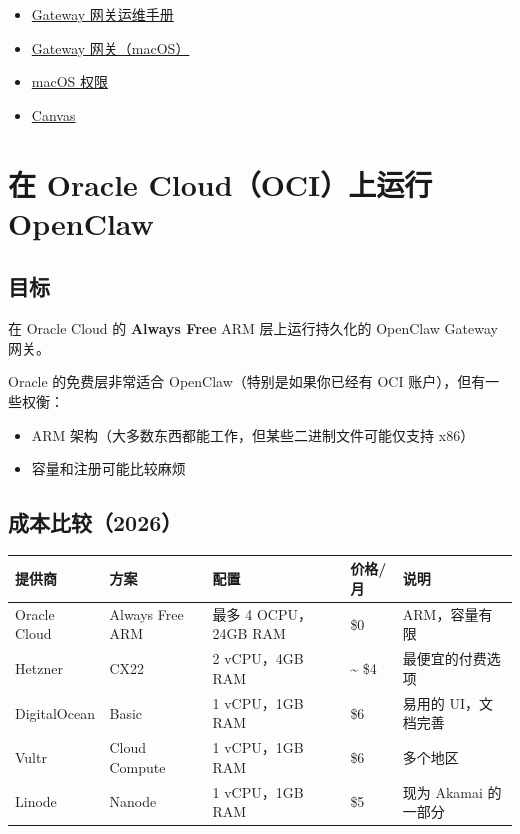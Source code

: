 \begin{itemize}
  \item \href{/gateway}{Gateway 网关运维手册}
  \item \href{/platforms/mac/bundled-gateway}{Gateway 网关（macOS）}
  \item \href{/platforms/mac/permissions}{macOS 权限}
  \item \href{/platforms/mac/canvas}{Canvas}
\end{itemize}



\clearpage

\section{在 Oracle Cloud（OCI）上运行 OpenClaw}


\subsection{目标}


在 Oracle Cloud 的 \textbf{Always Free} ARM 层上运行持久化的 OpenClaw Gateway 网关。

Oracle 的免费层非常适合 OpenClaw（特别是如果你已经有 OCI 账户），但有一些权衡：

\begin{itemize}
  \item ARM 架构（大多数东西都能工作，但某些二进制文件可能仅支持 x86）
  \item 容量和注册可能比较麻烦
\end{itemize}


\subsection{成本比较（2026）}



\begin{table}[h]
\centering
\small
\begin{tabular}{|l|l|l|l|l|}
\hline
提供商 & 方案 & 配置 & 价格/月 & 说明 \\
\hline
Oracle Cloud & Always Free ARM & 最多 4 OCPU，24GB RAM & \$0 & ARM，容量有限 \\
\hline
Hetzner & CX22 & 2 vCPU，4GB RAM & \textasciitilde{} \$4 & 最便宜的付费选项 \\
\hline
DigitalOcean & Basic & 1 vCPU，1GB RAM & \$6 & 易用的 UI，文档完善 \\
\hline
Vultr & Cloud Compute & 1 vCPU，1GB RAM & \$6 & 多个地区 \\
\hline
Linode & Nanode & 1 vCPU，1GB RAM & \$5 & 现为 Akamai 的一部分 \\
\hline
\end{tabular}
\end{table}



